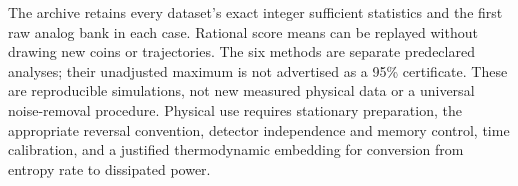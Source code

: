 The archive retains every dataset's exact integer sufficient statistics and
the first raw analog bank in each case. Rational score means can be replayed
without drawing new coins or trajectories. The six methods are separate
predeclared analyses; their unadjusted maximum is not advertised as a 95\%
certificate. These are reproducible simulations, not new measured physical
data or a universal noise-removal procedure. Physical use requires stationary
preparation, the appropriate reversal convention, detector independence and
memory control, time calibration, and a justified thermodynamic embedding for
conversion from entropy rate to dissipated power.
